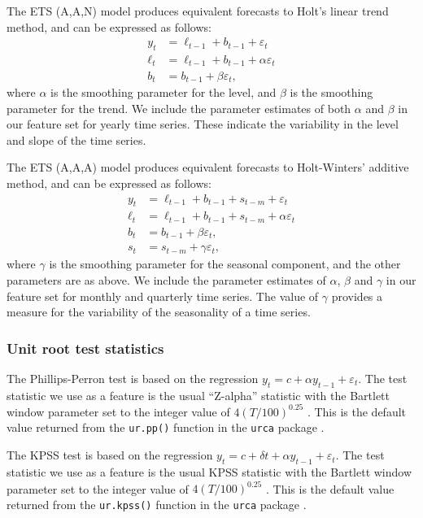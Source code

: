 \documentclass[11pt,a4paper,]{article}
\begin{document}
The ETS (A,A,N) model \autocite{expsmooth08} produces equivalent forecasts to Holt's linear trend method, and can be expressed as follows:
\begin{align*}
  y_t    & = \ell_{t-1}+b_{t-1}+\varepsilon_t\\
  \ell_t & = \ell_{t-1}+b_{t-1}+\alpha \varepsilon_t\\
  b_t    & = b_{t-1}+\beta \varepsilon_t,
\end{align*}
where \(\alpha\) is the smoothing parameter for the level, and \(\beta\) is the smoothing parameter for the trend. We include the parameter estimates of both \(\alpha\) and \(\beta\) in our feature set for yearly time series. These indicate the variability in the level and slope of the time series.

The ETS (A,A,A) model \autocite{expsmooth08} produces equivalent forecasts to Holt-Winters' additive method, and can be expressed as follows:
\begin{align*}
  y_t    & = \ell_{t-1}+b_{t-1}+s_{t-m}+\varepsilon_t\\
  \ell_t & = \ell_{t-1}+b_{t-1}+s_{t-m}+\alpha \varepsilon_t\\
  b_t    & = b_{t-1}+\beta \varepsilon_t,\\
  s_t &= s_{t-m} + \gamma\varepsilon_t,
\end{align*}
where \(\gamma\) is the smoothing parameter for the seasonal component, and the other parameters are as above. We include the parameter estimates of \(\alpha\), \(\beta\) and \(\gamma\) in our feature set for monthly and quarterly time series. The value of \(\gamma\) provides a measure for the variability of the seasonality of a time series.

\hypertarget{unit-root-test-statistics}{%
\subsubsection*{Unit root test statistics}\label{unit-root-test-statistics}}

The Phillips-Perron test is based on the regression \(y_t= c + \alpha y_{t-1}+ \varepsilon_t\). The test statistic we use as a feature is the usual ``Z-alpha'' statistic with the Bartlett window parameter set to the integer value of \(4(T/100)^{0.25}\) \autocite{Pfaff2008}. This is the default value returned from the \texttt{ur.pp()} function in the \texttt{urca} package \autocite{pfaff2016package}.

The KPSS test is based on the regression \(y_t=c+\delta t+\alpha y_{t-1}+\varepsilon_t\). The test statistic we use as a feature is the usual KPSS statistic with the Bartlett window parameter set to the integer value of \(4(T/100)^{0.25}\) \autocite{Pfaff2008}. This is the default value returned from the \texttt{ur.kpss()} function in the \texttt{urca} package \autocite{pfaff2016package}.
\end{document}
